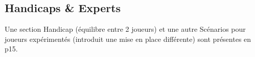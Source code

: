 \documentclass[10pt, a4paper]{article}	%
\begin{document}
\begin{multicols}{3}
\section{Handicaps \& Experts}
Une section \og Handicap\fg{} (équilibre entre 2 joueurs) et une autre \og Scénarios pour joueurs expérimentés\fg{} (introduit une mise en place différente) sont présentes en p15.

\end{multicols}
\end{document}
